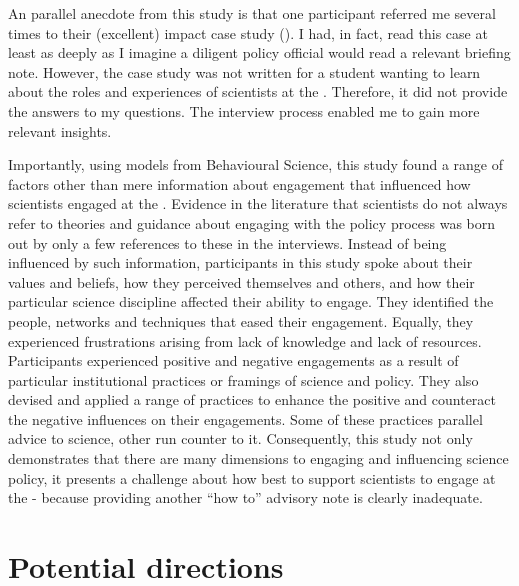 An parallel anecdote from this study is that one participant referred me several times to their (excellent) impact case study (). I had, in fact, read this case at least as deeply as I imagine a diligent policy official would read a relevant briefing note. However, the case study was not written for a student wanting to learn about the roles and experiences of scientists at the \CAN{} \SPI. Therefore, it did not provide the answers to my questions. The interview process enabled me to gain more relevant insights.

Importantly, using models from Behavioural Science, this study found a range of factors other than mere information about engagement that influenced how scientists engaged at the \SPI. Evidence in the literature that scientists do not always refer to theories and guidance about engaging with the policy process was born out by only a few references to these in the interviews. Instead of being influenced by such information, participants in this study spoke about their values and beliefs, how they perceived themselves and others, and how their particular science discipline affected their ability to engage. They identified the people, networks and techniques that eased their engagement. Equally, they experienced frustrations arising from lack of knowledge and lack of resources. Participants experienced positive and negative engagements as a result of particular institutional practices or framings of \CAN{} science and policy. They also devised and applied a range of practices to enhance the positive and counteract the negative influences on their engagements. Some of these practices parallel advice to science, other run counter to it. Consequently, this study not only demonstrates that there are many dimensions to engaging and influencing \CAN{} science policy, it presents a challenge about how best to support scientists to engage at the \SPI{} - because providing another ``how to'' advisory note is clearly inadequate.


\section{Potential directions}\label{sec:disdirections}

